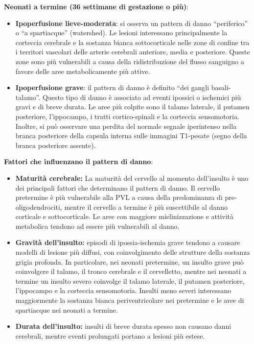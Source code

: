 \textbf{Neonati a termine (36 settimane di gestazione o più)}:

\begin{itemize}
	\tightlist
	\item
	\textbf{Ipoperfusione lieve-moderata}: si osserva un pattern di danno ``periferico'' o ``a spartiacque'' (watershed). Le lesioni interessano principalmente la corteccia cerebrale e la sostanza bianca sottocorticale nelle zone di confine tra i territori vascolari delle arterie cerebrali anteriore, media e posteriore. Queste zone sono più vulnerabili a causa della ridistribuzione del flusso sanguigno a favore delle aree metabolicamente più attive.
	\item
	\textbf{Ipoperfusione grave}: il pattern di danno è definito ``dei gangli basali-talamo''. Questo tipo di danno è associato ad eventi ipossici o ischemici più gravi e di breve durata. Le aree più colpite sono il talamo laterale, il putamen posteriore, l'ippocampo, i tratti cortico-spinali e la corteccia sensomotoria. Inoltre, si può osservare una perdita del normale segnale iperintenso nella branca posteriore della capsula interna sulle immagini T1-pesate (segno della branca posteriore assente).
\end{itemize}

\textbf{Fattori che influenzano il pattern di danno}:

\begin{itemize}
	\tightlist
	\item
	\textbf{Maturità cerebrale:} La maturità del cervello al momento dell'insulto è uno dei principali fattori che determinano il pattern di danno. Il cervello pretermine è più vulnerabile alla PVL a causa della predominanza di pre-oligodendrociti, mentre il cervello a termine è più suscettibile al danno corticale e sottocorticale. Le aree con maggiore mielinizzazione e attività metabolica tendono ad essere più vulnerabili al danno.
	\item
	\textbf{Gravità dell'insulto:} episodi di ipossia-ischemia grave tendono a causare modelli di lesione più diffusi, con coinvolgimento delle strutture della sostanza grigia profonda. In particolare, nei neonati pretermine, un insulto grave può coinvolgere il talamo, il tronco cerebrale e il cervelletto, mentre nei neonati a termine un insulto severo coinvolge il talamo laterale, il putamen posteriore, l'ippocampo e la corteccia sensomotoria. Insulti meno severi interessano maggiormente la sostanza bianca periventricolare nei pretermine e le aree di spartiacque nei neonati a termine.
	\item
	\textbf{Durata dell'insulto:} insulti di breve durata spesso non causano danni cerebrali, mentre eventi prolungati portano a lesioni più estese.
\end{itemize}

